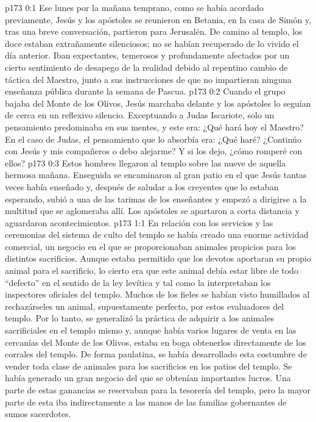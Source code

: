 \author{Comisión de seres intermedios}
\vs p173 0:1 Ese lunes por la mañana temprano, como se había acordado previamente, Jesús y los apóstoles se reunieron en Betania, en la casa de Simón y, tras una breve conversación, partieron para Jerusalén. De camino al templo, los doce estaban extrañamente silenciosos; no se habían recuperado de lo vivido el día anterior. Iban expectantes, temerosos y profundamente afectados por un cierto sentimiento de desapego de la realidad debido al repentino cambio de táctica del Maestro, junto a sus instrucciones de que no impartieran ninguna enseñanza pública durante la semana de Pascua.
\vs p173 0:2 Cuando el grupo bajaba del Monte de los Olivos, Jesús marchaba delante y los apóstoles lo seguían de cerca en un reflexivo silencio. Exceptuando a Judas Iscariote, solo un pensamiento predominaba en sus mentes, y este era: ¿Qué hará hoy el Maestro? En el caso de Judas, el pensamiento que lo absorbía era: ¿Qué haré? ¿Continúo con Jesús y mis compañeros o debo alejarme? Y si los dejo, ¿cómo romperé con ellos?
\vs p173 0:3 Estos hombres llegaron al templo sobre las nueve de aquella hermosa mañana. Enseguida se encaminaron al gran patio en el que Jesús tantas veces había enseñado y, después de saludar a los creyentes que lo estaban esperando, subió a una de las tarimas de los enseñantes y empezó a dirigirse a la multitud que se aglomeraba allí. Los apóstoles se apartaron a corta distancia y aguardaron acontecimientos.
\vs p173 1:1 En relación con los servicios y las ceremonias del sistema de culto del templo se había creado una enorme actividad comercial, un negocio en el que se proporcionaban animales propicios para los distintos sacrificios. Aunque estaba permitido que los devotos aportaran su propio animal para el sacrificio, lo cierto era que este animal debía estar libre de todo “defecto” en el sentido de la ley levítica y tal como la interpretaban los inspectores oficiales del templo. Muchos de los fieles se habían visto humillados al rechazárseles un animal, supuestamente perfecto, por estos evaluadores del templo. Por lo tanto, se generalizó la práctica de adquirir a los animales sacrificiales en el templo mismo y, aunque había varios lugares de venta en las cercanías del Monte de los Olivos, estaba en boga obtenerlos directamente de los corrales del templo. De forma paulatina, se había desarrollado esta costumbre de vender toda clase de animales para los sacrificios en los patios del templo. Se había generado un gran negocio del que se obtenían importantes lucros. Una parte de estas ganancias se reservaban para la tesorería del templo, pero la mayor parte de esta iba indirectamente a las manos de las familias gobernantes de sumos sacerdotes.
